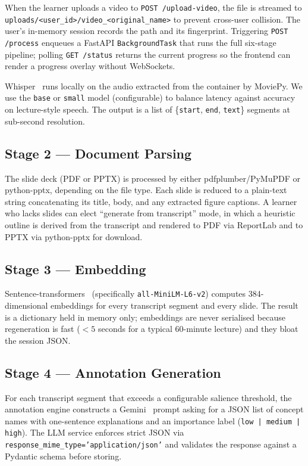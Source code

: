 \documentclass[conference]{IEEEtran}
\begin{document}
When the learner uploads a video to \texttt{POST /upload-video}, the file is streamed to \texttt{uploads/<user\_id>/video\_<original\_name>} to prevent cross-user collision. The user's in-memory session records the path and its fingerprint. Triggering \texttt{POST /process} enqueues a FastAPI \texttt{BackgroundTask} that runs the full six-stage pipeline; polling \texttt{GET /status} returns the current progress so the frontend can render a progress overlay without WebSockets.

Whisper~\cite{whisper} runs locally on the audio extracted from the container by MoviePy. We use the \texttt{base} or \texttt{small} model (configurable) to balance latency against accuracy on lecture-style speech. The output is a list of \{\texttt{start}, \texttt{end}, \texttt{text}\} segments at sub-second resolution.

\subsection{Stage 2 --- Document Parsing}

The slide deck (PDF or PPTX) is processed by either pdfplumber/PyMuPDF or python-pptx, depending on the file type. Each slide is reduced to a plain-text string concatenating its title, body, and any extracted figure captions. A learner who lacks slides can elect ``generate from transcript'' mode, in which a heuristic outline is derived from the transcript and rendered to PDF via ReportLab and to PPTX via python-pptx for download.

\subsection{Stage 3 --- Embedding}

Sentence-transformers~\cite{sbert} (specifically \texttt{all-MiniLM-L6-v2}) computes 384-dimensional embeddings for every transcript segment and every slide. The result is a dictionary held in memory only; embeddings are never serialised because regeneration is fast ($<5$ seconds for a typical 60-minute lecture) and they bloat the session JSON.

\subsection{Stage 4 --- Annotation Generation}

For each transcript segment that exceeds a configurable salience threshold, the annotation engine constructs a Gemini~\cite{gemini} prompt asking for a JSON list of concept names with one-sentence explanations and an importance label (\texttt{low | medium | high}). The LLM service enforces strict JSON via \texttt{response\_mime\_type='application/json'} and validates the response against a Pydantic schema before storing.
\end{document}

